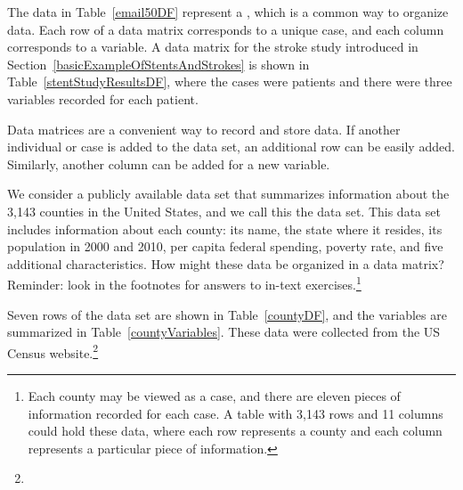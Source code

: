 
The data in Table~\ref{email50DF} represent a , which is a common way to organize data. Each row of a data matrix corresponds to a unique case, and each column corresponds to a variable. A data matrix for the stroke study introduced in Section~\ref{basicExampleOfStentsAndStrokes} is shown in Table~\vref{stentStudyResultsDF}, where the cases were patients and there were three variables recorded for each patient.

Data matrices are a convenient way to record and store data. If another individual or case is added to the data set, an additional row can be easily added. Similarly, another column can be added for a new variable.


\begin{exercise}
We consider a publicly available data set that summarizes information about the 3,143 counties in the United States, and we call this the  data set. This data set includes information about each county: its name, the state where it resides, its population in 2000 and 2010, per capita federal spending, poverty rate, and five additional characteristics. How might these data be organized in a data matrix? Reminder: look in the footnotes for answers to in-text exercises.\footnote{Each county may be viewed as a case, and there are eleven pieces of information recorded for each case. A table with 3,143 rows and 11 columns could hold these data, where each row represents a county and each column represents a particular piece of information.}
\end{exercise}

\noindent Seven rows of the  data set are shown in Table~\ref{countyDF}, and the variables are summarized in Table~\ref{countyVariables}. These data were collected from the US Census website.\footnote{}

